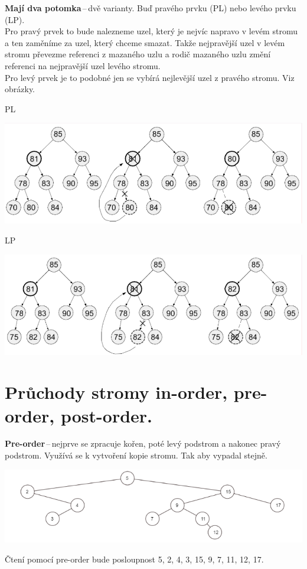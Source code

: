 \textbf{Mají dva potomka}\,--\,dvě varianty. Buď pravého prvku (PL) nebo levého prvku (LP).\\
Pro pravý prvek to bude nalezneme uzel, který je nejvíc napravo v levém stromu a ten zaměníme za uzel, který chceme smazat. Takže nejpravější uzel v levém stromu převezme referenci z mazaného uzlu a rodič mazaného uzlu změní referenci na nejpravější uzel levého stromu. \\
Pro levý prvek je to podobné jen se vybírá nejlevější uzel z pravého stromu. Viz obrázky.

PL
\begin{center}
\includegraphics[scale=0.8]{BPC-TIN/images/treePL.PNG}
\end{center}

LP
\begin{center}
\includegraphics[scale=0.8]{BPC-TIN/images/treeLP.PNG}
\end{center}




\newpage
\section{Průchody stromy in-order, pre-order, post-order.}
\textbf{Pre-order}\,--\,nejprve se zpracuje kořen, poté levý podstrom a nakonec pravý podstrom. Využívá se k vytvoření kopie stromu. Tak aby vypadal stejně.
\begin{center}
\includegraphics[scale=1]{BPC-TIN/images/tree.PNG}
\end{center}
Čtení pomocí pre-order bude posloupnost 5, 2, 4, 3, 15, 9, 7, 11, 12, 17.

